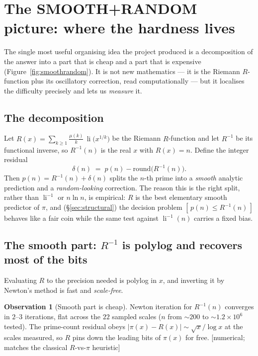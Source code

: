 \documentclass[11pt]{article}
\theoremstyle{plain}
\theoremstyle{definition}
\newtheorem{observation}[theorem]{Observation}
\theoremstyle{remark}
\newcommand{\stat}[1]{\quad\textnormal{\footnotesize\textsf{[\textcolor{accent}{#1}]}}}
\DeclareMathOperator{\li}{li}
\newcommand{\Rinv}{R^{-1}}
\begin{document}
\section{The SMOOTH+RANDOM picture: where the hardness lives}
\label{sec:smoothrandom}

The single most useful organising idea the project produced is a decomposition
of the answer into a part that is cheap and a part that is expensive
(Figure~\ref{fig:smoothrandom}). It is not new mathematics --- it is the Riemann
$R$-function plus its oscillatory correction, read computationally --- but it
localises the difficulty precisely and lets us \emph{measure} it.

\subsection{The decomposition}

Let $R(x)=\sum_{k\ge 1}\frac{\mu(k)}{k}\,\li\!\big(x^{1/k}\big)$ be the Riemann
$R$-function and let $\Rinv$ be its functional inverse, so $\Rinv(n)$ is the real
$x$ with $R(x)=n$. Define the integer residual
\[
  \delta(n) \;=\; p(n) - \mathrm{round}\big(\Rinv(n)\big).
\]
Then $p(n)=\Rinv(n)+\delta(n)$ splits the $n$-th prime into a \emph{smooth}
analytic prediction and a \emph{random-looking} correction. The reason this is
the right split, rather than $\li^{-1}$ or $n\ln n$, is empirical: $R$ is the
best elementary smooth predictor of $\pi$, and (\S\ref{sec:structural}) the
decision problem $[\,p(n)\le \Rinv(n)\,]$ behaves like a fair coin while the
same test against $\li^{-1}(n)$ carries a fixed bias.

\subsection{The smooth part: \texorpdfstring{$\Rinv$}{R-inverse} is polylog and
recovers most of the bits}

Evaluating $R$ to the precision needed is polylog in $x$, and inverting it by
Newton's method is fast and \emph{scale-free}.

\begin{observation}[Smooth part is cheap]
\label{obs:smooth}
Newton iteration for $\Rinv(n)$ converges in $2$--$3$ iterations, flat across
the $22$ sampled scales ($n$ from ${\sim}200$ to ${\sim}1.2\times10^6$ tested). The
prime-count residual obeys $|\pi(x)-R(x)|\sim \sqrt{x}/\log x$ at the scales
measured, so $R$ pins down the leading bits of $\pi(x)$ for free.
\stat{numerical; matches the classical $R$-vs-$\pi$ heuristic}
\end{observation}
\end{document}
